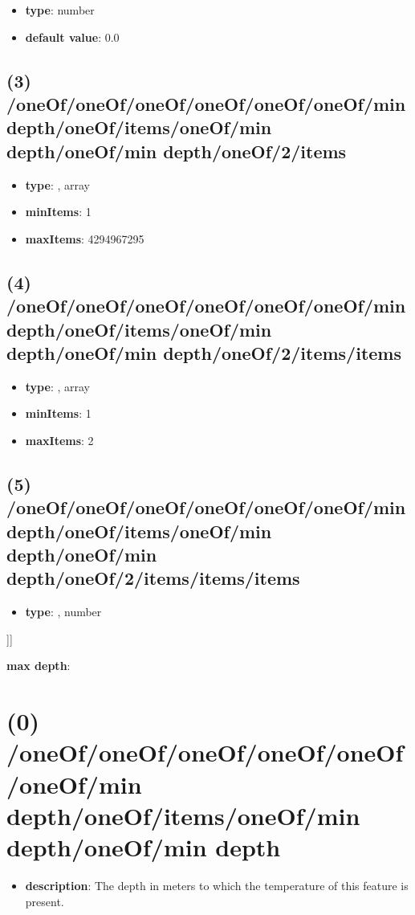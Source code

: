 \begin{itemize}[leftmargin=4em]\item {\bf type}: number\item {\bf default value}: 0.0
\end{itemize}\subsection{(3) /oneOf/oneOf/oneOf/oneOf/oneOf/oneOf/min depth/oneOf/items/oneOf/min depth/oneOf/min depth/oneOf/2/items}
\begin{itemize}[leftmargin=3em]\item {\bf type}: , array\item {\bf minItems}: 1
\item {\bf maxItems}: 4294967295
\end{itemize}\subsection{(4) /oneOf/oneOf/oneOf/oneOf/oneOf/oneOf/min depth/oneOf/items/oneOf/min depth/oneOf/min depth/oneOf/2/items/items}
\begin{itemize}[leftmargin=4em]\item {\bf type}: , array\item {\bf minItems}: 1
\item {\bf maxItems}: 2
\end{itemize}\subsection{(5) /oneOf/oneOf/oneOf/oneOf/oneOf/oneOf/min depth/oneOf/items/oneOf/min depth/oneOf/min depth/oneOf/2/items/items/items}
\begin{itemize}[leftmargin=5em]\item {\bf type}: , number\end{itemize}]]\item {\bf max depth}: \section{(0) /oneOf/oneOf/oneOf/oneOf/oneOf/oneOf/min depth/oneOf/items/oneOf/min depth/oneOf/min depth}
\begin{itemize}[leftmargin=0em]\item {\bf description}: The depth in meters to which the temperature of this feature is present.
\end{itemize}
